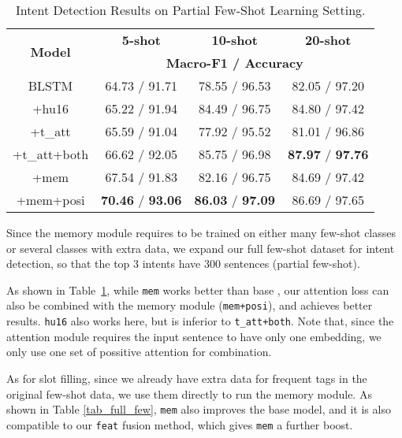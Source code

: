 \begin{table}
\setlength{\tabcolsep}{0.23em}
\centering
\small{
\begin{tabular}{|c|c|c|c|}

\hline
\multirow{2}{*}{\textbf{Model}}  & \multicolumn{1}{|c|}{\textbf{5-shot}} & \multicolumn{1}{|c|}{\textbf{10-shot}} & \multicolumn{1}{|c|}{\textbf{20-shot}}  \\
\cline{2-4}
 & \multicolumn{3}{|c|}{\textbf{Macro-F1 / Accuracy}}   \\
\hline
\rowcolor{Gray} BLSTM & 64.73 / 91.71 & 78.55 / 96.53 & 82.05 / 97.20 \\
\hline
+hu16 & 65.22 / 91.94 & 84.49 / 96.75 & 84.80 / 97.42 \\
\hline
\rowcolor{Gray} +t\_att & 65.59 / 91.04 & 77.92 / 95.52 & 81.01 / 96.86 \\
\hline
+t\_att+both & 66.62 / 92.05 & 85.75 / 96.98 & \textbf{87.97} / \textbf{97.76} \\
\hline
\rowcolor{Gray} +mem & 67.54 / 91.83 & 82.16 / 96.75 & 84.69 / 97.42 \\
\hline
+mem+posi & \textbf{70.46} / \textbf{93.06} & \textbf{86.03} / \textbf{97.09} & 86.69 / 97.65 \\
\hline

\end{tabular}
}
\caption{Intent Detection Results on Partial Few-Shot Learning Setting.}
\label{tab_intent_few_fill}
\end{table}

Since the memory module requires to be trained on either many few-shot classes or several classes with extra data,
we expand our full few-shot dataset for intent detection, so that the top 3 intents have 300 sentences (partial few-shot).

As shown in Table~\ref{tab_intent_few_fill}, while \texttt{mem} works better than base \BLSTM, our attention loss can also be combined with the memory module (\texttt{mem+posi}), and achieves better results.
\texttt{hu16} also works here, but is inferior to \texttt{t\_att+both}.
Note that, since the attention module requires the input sentence to have only one embedding, we only use one set of possitive attention for combination.

As for slot filling, since we already have extra data for frequent tags in the original few-shot data, we use them directly to run the memory module. As shown in Table \ref{tab_full_few}, \texttt{mem} also improves the base model, and it is also compatible to our \texttt{feat} fusion method, which gives \texttt{mem} a further boost.

